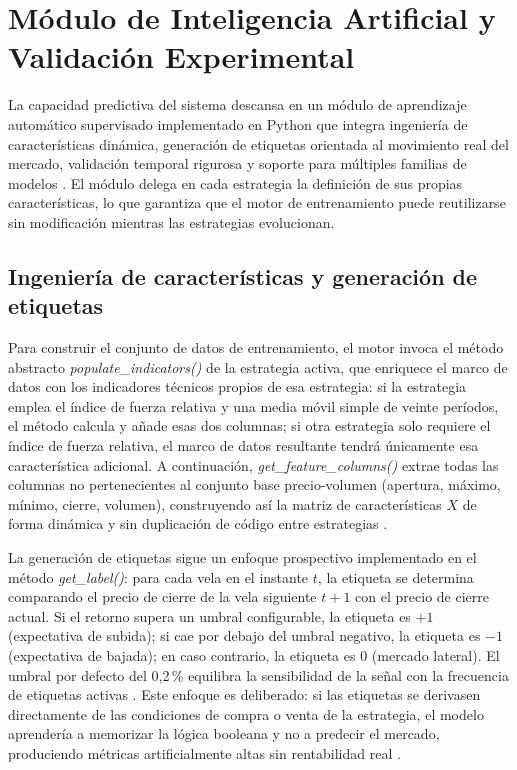 \section{Módulo de Inteligencia Artificial y Validación Experimental}
\label{sec:ml}

La capacidad predictiva del sistema descansa en un módulo de aprendizaje
automático supervisado implementado en Python que integra ingeniería de
características dinámica, generación de etiquetas orientada al movimiento
real del mercado, validación temporal rigurosa y soporte para múltiples
familias de modelos \parencite{goodfellow_deep_2016}. El módulo delega en
cada estrategia la definición de sus propias características, lo que garantiza
que el motor de entrenamiento puede reutilizarse sin modificación mientras las
estrategias evolucionan.

\subsection{Ingeniería de características y generación de etiquetas}

Para construir el conjunto de datos de entrenamiento, el motor invoca el
método abstracto \textit{populate\_indicators()} de la estrategia activa,
que enriquece el marco de datos con los indicadores técnicos propios de esa
estrategia: si la estrategia emplea el índice de fuerza relativa y una media
móvil simple de veinte períodos, el método calcula y añade esas dos columnas;
si otra estrategia solo requiere el índice de fuerza relativa, el marco de
datos resultante tendrá únicamente esa característica adicional. A
continuación, \textit{get\_feature\_columns()} extrae todas las columnas no
pertenecientes al conjunto base precio-volumen (apertura, máximo, mínimo,
cierre, volumen), construyendo así la matriz de características $X$ de forma
dinámica y sin duplicación de código entre estrategias
\parencite{mckinney_python_2022}.

La generación de etiquetas sigue un enfoque prospectivo implementado en el
método \textit{get\_label()}: para cada vela en el instante $t$, la etiqueta
se determina comparando el precio de cierre de la vela siguiente $t+1$ con
el precio de cierre actual. Si el retorno supera un umbral configurable, la
etiqueta es $+1$ (expectativa de subida); si cae por debajo del umbral
negativo, la etiqueta es $-1$ (expectativa de bajada); en caso contrario, la
etiqueta es $0$ (mercado lateral). El umbral por defecto del 0,2\,\%
equilibra la sensibilidad de la señal con la frecuencia de etiquetas activas
\parencite{lopez_de_prado_advances_2018}. Este enfoque es deliberado: si las
etiquetas se derivasen directamente de las condiciones de compra o venta de la
estrategia, el modelo aprendería a memorizar la lógica booleana y no a
predecir el mercado, produciendo métricas artificialmente altas sin
rentabilidad real \parencite{goodfellow_deep_2016}.

